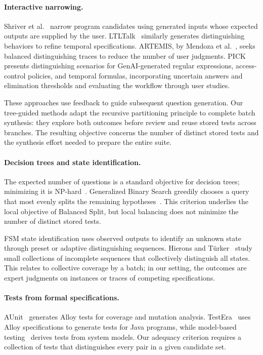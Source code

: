 \documentclass[runningheads]{llncs}
\newcommand{\methodname}[1]{\textup{\textsf{#1}}}
\newcommand{\balancedsplit}{\methodname{Balanced Split}}
\begin{document}
\paragraph{Interactive narrowing.}
Shriver et al.~\cite{shriver2017end} narrow program candidates using generated
inputs whose expected outputs are supplied by the user.
LTLTalk~\cite{gavran2020interactive} similarly generates distinguishing
behaviors to refine temporal specifications. ARTEMIS, by Mendoza et
al.~\cite{mendoza2026automating}, seeks balanced distinguishing traces to
reduce the number of user judgments. PICK~\cite{prasad2026pick} presents
distinguishing scenarios for GenAI-generated regular expressions,
access-control policies, and temporal formulas, incorporating uncertain
answers and elimination thresholds and evaluating the workflow through user
studies.

These approaches use feedback to guide subsequent question generation. Our
tree-guided methods adapt the recursive partitioning principle to complete
batch synthesis: they explore both outcomes before review and reuse stored
tests across branches. The resulting objective concerns the number of distinct
stored tests and the synthesis effort needed to prepare the entire suite.

\paragraph{Decision trees and state identification.}
The expected number of questions is a standard objective for decision trees;
minimizing it is NP-hard~\cite{hyafil1976constructing}. Generalized Binary Search greedily
chooses a query that most evenly splits the remaining
hypotheses~\cite{nowak2011geometry}. This criterion underlies the local
objective of \balancedsplit{}, but local balancing does not minimize the
number of distinct stored tests.

FSM state identification uses observed outputs to identify an unknown state
through preset or adaptive distinguishing sequences. Hierons and
T\"urker~\cite{hierons2015incomplete} study small collections of incomplete
sequences that collectively distinguish all states. This relates to collective
coverage by a batch; in our setting, the outcomes are expert judgments on
instances or traces of competing specifications.

\paragraph{Tests from formal specifications.}
AUnit~\cite{sullivan2017automated} generates Alloy tests for coverage and
mutation analysis. TestEra~\cite{marinov2001testera} uses Alloy specifications
to generate tests for Java programs, while model-based
testing~\cite{dalal1999model} derives tests from system models. Our adequacy
criterion requires a collection of tests that distinguishes every pair in a
given candidate set.
\end{document}

